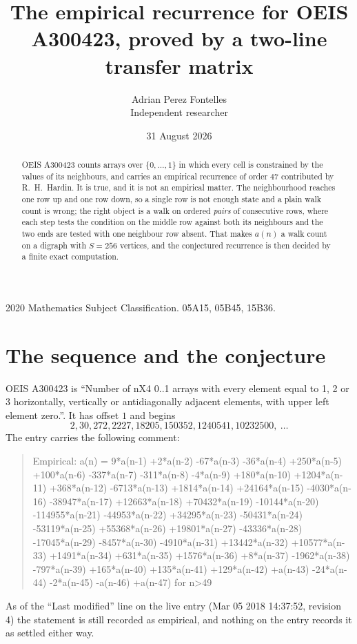 \documentclass[11pt,a4paper]{article}
\title{The empirical recurrence for OEIS A300423, proved by a two-line transfer matrix}
\author{Adrian Perez Fontelles\\ \small Independent researcher}
\date{31 August 2026}
\theoremstyle{plain}
\theoremstyle{definition}
\begin{document}
\maketitle

\begin{abstract}
OEIS A300423 counts arrays over $\{0,\dots,1\}$ in which every cell is constrained by the
values of its neighbours, and carries an empirical recurrence of order $47$ contributed
by R.~H.~Hardin. It is true, and it is not an empirical matter. The neighbourhood reaches one
row up and one row down, so a single row is not enough state and a plain walk count
is wrong; the right object is a walk on ordered \emph{pairs} of consecutive rows, where
each step tests the condition on the middle row against both its neighbours and the two
ends are tested with one neighbour row absent. That makes $a(n)$ a walk count on a digraph
with $S=256$ vertices, and the conjectured recurrence is then decided by a finite exact
computation.
\end{abstract}

\noindent\small 2020 Mathematics Subject Classification. 05A15, 05B45, 15B36.\normalsize

\section{The sequence and the conjecture}

OEIS A300423 is ``Number of nX4 0..1 arrays with every element equal to 1, 2 or 3 horizontally, vertically or antidiagonally adjacent elements, with upper left element zero.''. It has offset $1$ and begins
\[
2, 30, 272, 2227, 18205, 150352, 1240541, 10232500,\ \dots
\]
The entry carries the following comment:
\begin{quote}\small
Empirical: a(n) = 9*a(n-1) +2*a(n-2) -67*a(n-3) -36*a(n-4) +250*a(n-5) +100*a(n-6) -337*a(n-7) -311*a(n-8) -4*a(n-9) +180*a(n-10) +1204*a(n-11) +368*a(n-12) -6713*a(n-13) +1814*a(n-14) +24164*a(n-15) -4030*a(n-16) -38947*a(n-17) +12663*a(n-18) +70432*a(n-19) -10144*a(n-20) -114955*a(n-21) -44953*a(n-22) +34295*a(n-23) -50431*a(n-24) -53119*a(n-25) +55368*a(n-26) +19801*a(n-27) -43336*a(n-28) -17045*a(n-29) -8457*a(n-30) -4910*a(n-31) +13442*a(n-32) +10577*a(n-33) +1491*a(n-34) +631*a(n-35) +1576*a(n-36) +8*a(n-37) -1962*a(n-38) -797*a(n-39) +165*a(n-40) +135*a(n-41) +129*a(n-42) +a(n-43) -24*a(n-44) -2*a(n-45) -a(n-46) +a(n-47) for n>49
\end{quote}
As of the ``Last modified'' line on the live entry (Mar 05 2018 14:37:52, revision 4) the statement is
still recorded as empirical, and nothing on the entry records it as settled either way.
\end{document}
